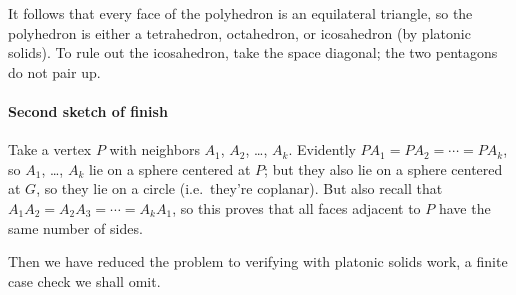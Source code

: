 It follows that every face of the polyhedron is an equilateral triangle, so the polyhedron is either a tetrahedron, octahedron, or icosahedron (by platonic solids). To rule out the icosahedron, take the space diagonal; the two pentagons do not pair up. 

\paragraph{Second sketch of finish}
Take a vertex $P$ with neighbors $A_1$, $A_2$, \ldots, $A_k$. Evidently $PA_1=PA_2=\cdots=PA_k$, so $A_1$, \ldots, $A_k$ lie on a sphere centered at $P$; but they also lie on a sphere centered at $G$, so they lie on a circle (i.e.\ they're coplanar). But also recall that $A_1A_2=A_2A_3=\cdots=A_kA_1$, so this proves that all faces adjacent to $P$ have the same number of sides.

Then we have reduced the problem to verifying with platonic solids work, a finite case check we shall omit.
